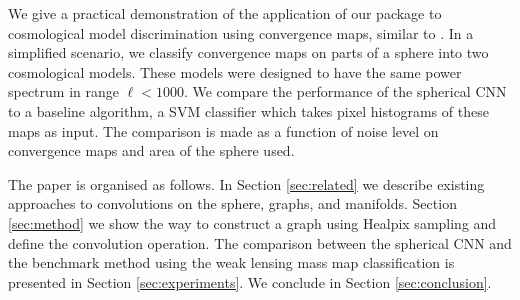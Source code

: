\documentclass[final,twocolumn,3p,times,authoryear]{elsarticle}
\newcommand{\todo}[1]{{\color[rgb]{.6,.1,.6}{#1}}}
\newcommand{\1}{\b{1}}              %
\newcommand{\0}{\b{0}}              %
\begin{document}
We give a practical demonstration of the application of our package to cosmological model discrimination using convergence maps, similar to \citep{schmelze2017cosmologicalmodel}.
In a simplified scenario, we classify convergence maps on parts of a sphere into two cosmological models.
These models were designed to have the same power spectrum in range $\ell < 1000$.
We compare the performance of the spherical CNN to a baseline algorithm, a SVM classifier which takes pixel histograms of these maps as input.
The comparison is made as a function of noise level on convergence maps and area of the sphere used.

The paper is organised as follows.
In Section \ref{sec:related} we describe existing approaches to convolutions on the sphere, graphs, and manifolds.
Section \ref{sec:method} we show the way to construct a graph using Healpix sampling and define the convolution operation.
The comparison between the spherical CNN and the benchmark method using the weak lensing mass map classification is presented in Section \ref{sec:experiments}.
We conclude in Section \ref{sec:conclusion}.


\end{document}
